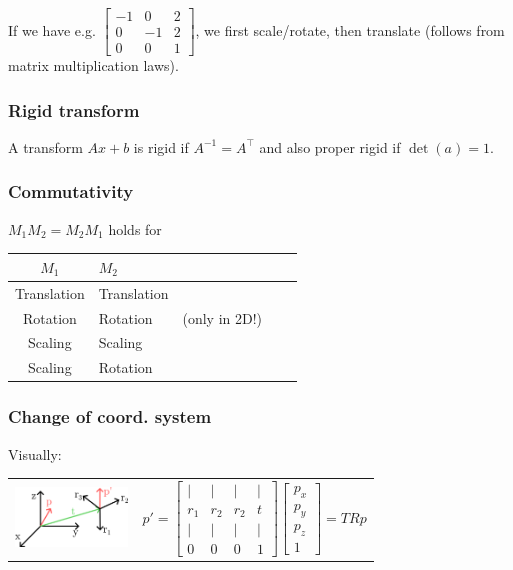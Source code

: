 \documentclass[a4paper,10pt]{article}
\renewcommand*{\arraystretch}{2}
\begin{document}
\egroup
If we have e.g. \(  \left[\begin{smallmatrix} -1 & 0 & 2 \\ 0 & -1 & 2 \\ 0 & 0 & 1 \end{smallmatrix}\right] \), we first scale/rotate, then translate (follows from matrix multiplication laws).

\subsubsection{Rigid transform} A transform \( Ax + b \) is rigid if \( A^{-1} = A^\top \) and also proper rigid if \( \det(a) = 1 \).

\subsubsection{Commutativity}
\( M_1 M_{2} = M_{2} M_{1} \) holds for
\begin{center}
    {\renewcommand{\arraystretch}{1.2}
    \begin{tabularx}{\linewidth}{c>{\centering\arraybackslash}Xc>{\centering\arraybackslash}Xc}
	\toprule
	\( M_{1} \) & \( M_{2} \) & \\
	\midrule
	Translation & Translation & \\
	Rotation & Rotation & (only in 2D!) \\
	Scaling & Scaling &\\
	Scaling & Rotation & \\
	\bottomrule
    \end{tabularx}
    }
\end{center}

\subsubsection{Change of coord. system} Visually:

\begin{tabular}{m{3cm}r}
    \includegraphics[width=3cm]{coord-system-change.png}
&
$
    p' = \left[\begin{smallmatrix} | & | & | & | \\ r_1 & r_2 & r_2 & t \\ | & | & | & | \\ 0 & 0 & 0 & 1 \end{smallmatrix}\right] \left[\begin{smallmatrix} p_x \\ p_y \\ p_z \\ 1 \end{smallmatrix}\right] = TRp
$
\\
\end{tabular}
\end{document}
